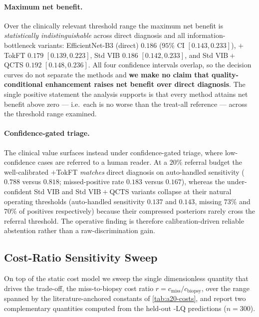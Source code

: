 \paragraph{Maximum net benefit.}
Over the clinically relevant threshold range the maximum net benefit is \emph{statistically
indistinguishable} across direct diagnosis and all information-bottleneck variants: EfficientNet-B3
(direct) $0.186$ ($95\%$ CI $[0.143,0.233]$), \qvib{}$+$TokFT $0.179$ $[0.139,0.223]$, Std VIB $0.186$
$[0.142,0.233]$, and Std VIB${}+{}$QCTS $0.192$ $[0.148,0.236]$. All four confidence intervals overlap,
so the decision curves do not separate the methods and \textbf{we make no claim that
quality-conditional enhancement raises net benefit over direct diagnosis}. The single positive
statement the analysis supports is that every method attains net benefit above zero --- i.e.\ each is no
worse than the treat-all reference --- across the threshold range examined.

\paragraph{Confidence-gated triage.}
The clinical value surfaces instead under confidence-gated triage, where low-confidence cases are
referred to a human reader. At a $20\%$ referral budget the well-calibrated \qvib{}$+$TokFT
\emph{matches} direct diagnosis on auto-handled sensitivity ($0.788$ versus $0.818$; missed-positive
rate $0.183$ versus $0.167$), whereas the under-confident Std VIB and Std VIB${}+{}$QCTS variants
collapse at their natural operating thresholds (auto-handled sensitivity $0.137$ and $0.143$, missing
$73\%$ and $70\%$ of positives respectively) because their compressed posteriors rarely cross the
referral threshold. The operative finding is therefore calibration-driven reliable abstention rather
than a raw-discrimination gain.

\subsection{Cost-Ratio Sensitivity Sweep}\label{app:a20-sweep}
On top of the static cost model we sweep the single dimensionless quantity that drives the trade-off,
the miss-to-biopsy cost ratio $r = c_{\mathrm{miss}}/c_{\mathrm{biopsy}}$, over the range spanned by the
literature-anchored constants of \cref{tab:a20-costs}, and report two complementary quantities computed
from the held-out \itb{}-LQ predictions ($n=300$).

